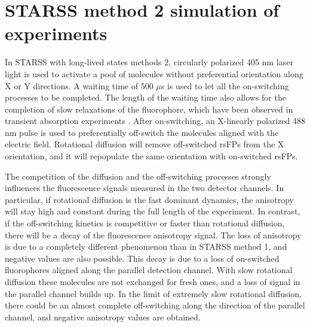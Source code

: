 \documentclass{article}
\begin{document}
\clearpage
\section{STARSS method 2 simulation of experiments}\label{sec:starss_modality2}
In STARSS with long-lived states methods 2, circularly polarized 405 nm laser light is used to activate a pool of molecules without preferential orientation along X or Y directions. A waiting time of 500 $\mu$s is used to let all the on-switching processes to be completed. The length of the waiting time also allows for the completion of slow relaxations of the fluorophore, which have been observed in transient absorption experiments \cite{Laptenok2018, Woodhouse2020}.
After on-switching, an X-linearly polarized 488 nm pulse is used to preferentially off-switch the molecules aligned with the electric field. Rotational diffusion will remove off-switched rsFPs from the X orientation, and it will repopulate the same orientation with on-switched rsFPs.

The competition of the diffusion and the off-switching processes strongly influences the fluorescence signals measured in the two detector channels. In particular, if rotational diffusion is the fast dominant dynamics, the anisotropy will stay high and constant during the full length of the experiment. In contrast, if the off-switching kinetics is competitive or faster than rotational diffusion, there will be a decay of the fluorescence anisotropy signal. The loss of anisotropy is due to a completely different phenomenon than in STARSS method 1, and negative values are also possible. This decay is due to a loss of on-switched fluorophores aligned along the parallel detection channel. With slow rotational diffusion these molecules are not exchanged for fresh ones, and a loss of signal in the parallel channel builds up. In the limit of extremely slow rotational diffusion, there could be an almost complete off-switching along the direction of the parallel channel, and negative anisotropy values are obtained.
\end{document}
